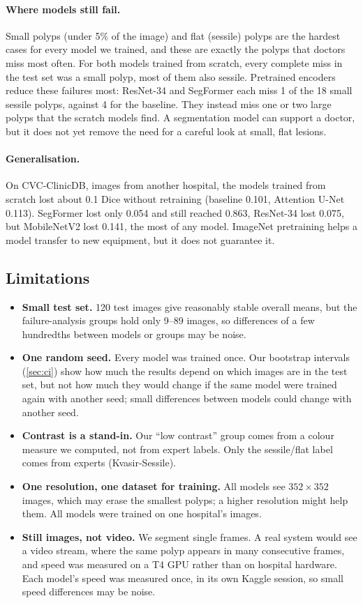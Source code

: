 \paragraph{Where models still fail.} Small polyps (under 5\% of the image) and flat (sessile) polyps are the hardest cases
for every model we trained, and these are exactly the polyps that doctors miss most often. For both models trained
from scratch, every complete miss in the test set was a small polyp, most of them also sessile. Pretrained encoders
reduce these failures most: ResNet-34 and SegFormer each miss 1 of the 18 small sessile polyps, against 4 for the
baseline. They instead miss one or two large polyps that the scratch models find. A segmentation model can support
a doctor, but it does not yet remove the need for a careful look at small, flat lesions.

\paragraph{Generalisation.} On CVC-ClinicDB, images from another hospital, the models trained from scratch lost about
0.1 Dice without retraining (baseline 0.101, Attention U-Net 0.113). SegFormer lost only 0.054 and still reached
0.863, ResNet-34 lost 0.075, but MobileNetV2 lost 0.141, the most of any model. ImageNet pretraining helps a model
transfer to new equipment, but it does not guarantee it.

\subsection{Limitations}
\label{sec:limits}
\begin{itemize}
  \item \textbf{Small test set.} 120 test images give reasonably stable overall means, but the failure-analysis groups hold
        only 9--89 images, so differences of a few hundredths between models or groups may be noise.
  \item \textbf{One random seed.} Every model was trained once. Our bootstrap intervals (\cref{sec:ci}) show how much the
        results depend on which images are in the test set, but not how much they would change if the same model were
        trained again with another seed; small differences between models could change with another seed.
  \item \textbf{Contrast is a stand-in.} Our ``low contrast'' group comes from a colour measure we computed, not from expert
        labels. Only the sessile/flat label comes from experts (Kvasir-Sessile).
  \item \textbf{One resolution, one dataset for training.} All models see $352\times352$ images, which may erase the smallest polyps;
        a higher resolution might help them. All models were trained on one hospital's images.
  \item \textbf{Still images, not video.} We segment single frames. A real system would see a video stream, where the same
        polyp appears in many consecutive frames, and speed was measured on a T4 GPU rather than on hospital hardware.
        Each model's speed was measured once, in its own Kaggle session, so small speed differences may be noise.
\end{itemize}

